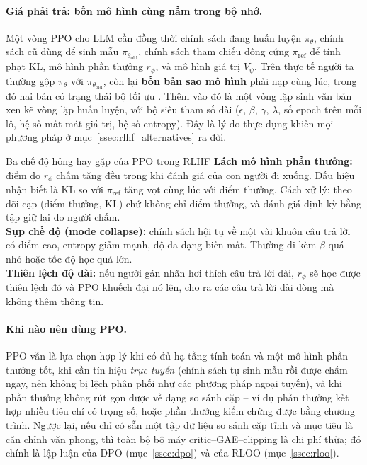 \paragraph{Giá phải trả: bốn mô hình cùng nằm trong bộ nhớ.}
Một vòng PPO cho LLM cần đồng thời chính sách đang huấn luyện \( \pi_{\theta} \), chính sách cũ dùng để sinh mẫu \( \pi_{\theta_{\text{old}}} \), chính sách tham chiếu đông cứng \( \pi_{\text{ref}} \) để tính phạt KL, mô hình phần thưởng \( r_{\phi} \), và mô hình giá trị \( V_{\psi} \). Trên thực tế người ta thường gộp \( \pi_{\theta} \) với \( \pi_{\theta_{\text{old}}} \), còn lại \textbf{bốn bản sao mô hình} phải nạp cùng lúc, trong đó hai bản có trạng thái bộ tối ưu \cite{ahmadian2024rloo}. Thêm vào đó là một vòng lặp sinh văn bản xen kẽ vòng lặp huấn luyện, với bộ siêu tham số dài (\( \epsilon \), \( \beta \), \( \gamma \), \( \lambda \), số epoch trên mỗi lô, hệ số mất mát giá trị, hệ số entropy). Đây là lý do thực dụng khiến mọi phương pháp ở mục~\ref{ssec:rlhf_alternatives} ra đời.

\begin{pitfall}{Ba chế độ hỏng hay gặp của PPO trong RLHF}
\textbf{Lách mô hình phần thưởng:} điểm do \( r_{\phi} \) chấm tăng đều trong khi đánh giá của con người đi xuống. Dấu hiệu nhận biết là KL so với \( \pi_{\text{ref}} \) tăng vọt cùng lúc với điểm thưởng. Cách xử lý: theo dõi cặp (điểm thưởng, KL) chứ không chỉ điểm thưởng, và đánh giá định kỳ bằng tập giữ lại do người chấm.\\[4pt]
\textbf{Sụp chế độ (mode collapse):} chính sách hội tụ về một vài khuôn câu trả lời có điểm cao, entropy giảm mạnh, độ đa dạng biến mất. Thường đi kèm \( \beta \) quá nhỏ hoặc tốc độ học quá lớn.\\[4pt]
\textbf{Thiên lệch độ dài:} nếu người gán nhãn hơi thích câu trả lời dài, \( r_{\phi} \) sẽ học được thiên lệch đó và PPO khuếch đại nó lên, cho ra các câu trả lời dài dòng mà không thêm thông tin.
\end{pitfall}

\paragraph{Khi nào nên dùng PPO.}
PPO vẫn là lựa chọn hợp lý khi có đủ hạ tầng tính toán và một mô hình phần thưởng tốt, khi cần tín hiệu \emph{trực tuyến} (chính sách tự sinh mẫu rồi được chấm ngay, nên không bị lệch phân phối như các phương pháp ngoại tuyến), và khi phần thưởng không rút gọn được về dạng so sánh cặp -- ví dụ phần thưởng kết hợp nhiều tiêu chí có trọng số, hoặc phần thưởng kiểm chứng được bằng chương trình. Ngược lại, nếu chỉ có sẵn một tập dữ liệu so sánh cặp tĩnh và mục tiêu là căn chỉnh văn phong, thì toàn bộ bộ máy critic--GAE--clipping là chi phí thừa; đó chính là lập luận của DPO (mục~\ref{ssec:dpo}) và của RLOO (mục~\ref{ssec:rloo}).

